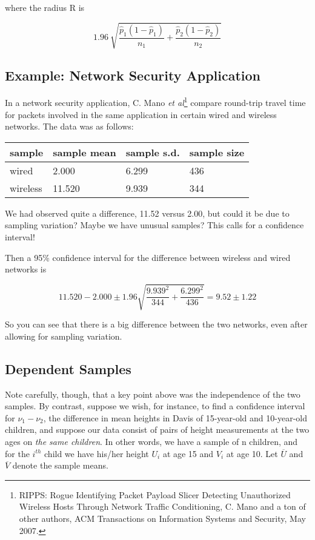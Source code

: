 where the radius R is

\begin{equation}
1.96 ~ \sqrt{
   \frac{\widehat{p}_1 (1 - \widehat{p}_1)}{n_1} +
   \frac{\widehat{p}_2 (1 - \widehat{p}_2)}{n_2}
}
\end{equation}

\subsection{Example:  Network Security Application}
\label{netsecapp}

In a network security application, C. Mano {\it et
al}\footnote{RIPPS: Rogue Identifying Packet Payload Slicer Detecting
Unauthorized Wireless Hosts Through Network Traffic Conditioning, C.
Mano and a ton of other authors, {\sc ACM Transactions on Information
Systems and Security}, May 2007.} compare round-trip travel time for
packets involved in the same application in certain wired and wireless
networks.  The data was as follows:

\begin{tabular}{|l|l|l|l|}
\hline
sample & sample mean & sample s.d. & sample size \\ \hline  \hline
wired & 2.000 & 6.299 & 436 \\ \hline
wireless & 11.520 & 9.939 & 344 \\ \hline
\end{tabular}

We had observed quite a difference, 11.52 versus 2.00, but could it be
due to sampling variation?  Maybe we have unusual samples?  This calls
for a confidence interval!

Then a 95\% confidence interval for the difference between wireless and
wired networks is

\begin{equation}
11.520 - 2.000 \pm 1.96 
\sqrt{\frac{9.939^2}{344} + \frac{6.299^2}{436}}
= 9.52 \pm 1.22
\end{equation}

So you can see that there is a big difference between the two networks,
even after allowing for sampling variation.

\subsection{Dependent Samples}
\label{depsams}

Note carefully, though, that a key point above was the independence of
the two samples.  By contrast, suppose we wish, for instance, to find a
confidence interval for $\nu_1 - \nu_2$, the difference in mean heights
in Davis of 15-year-old and 10-year-old children, and suppose our data
consist of pairs of height measurements at the two ages on {\it the same
children}.  In other words, we have a sample of n children, and for the
$i^{th}$ child we have his/her height $U_i$ at age 15 and $V_i$ at age
10.  Let $\overline{U}$ and $\overline{V}$ denote the sample means.

